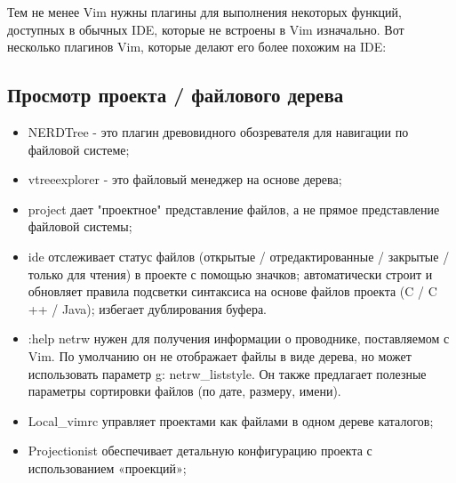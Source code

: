 Тем не менее Vim нужны плагины для выполнения некоторых функций, доступных в обычных IDE, которые 
не встроены в Vim изначально. Вот несколько плагинов Vim, которые делают его более похожим на IDE:\\

\subsection{Просмотр проекта / файлового дерева}
\begin{itemize}
    \item NERDTree - это плагин древовидного обозревателя для навигации по файловой системе;\\
    \item vtreeexplorer - это файловый менеджер на основе дерева;\\
    \item project дает "проектное" представление файлов, а не прямое представление файловой системы;\\
    \item ide отслеживает статус файлов (открытые / отредактированные / закрытые / только для чтения) 
        в проекте с помощью значков; автоматически строит и обновляет правила подсветки синтаксиса 
        на основе файлов проекта (C / C ++ / Java); избегает дублирования буфера.\\
    \item :help netrw нужен для получения информации о проводнике, поставляемом с Vim. По 
        умолчанию он не отображает файлы в виде дерева, но может использовать параметр 
        g: netrw\_liststyle. Он также предлагает полезные параметры сортировки файлов (по дате, 
        размеру, имени).\\
    \item Local\_vimrc управляет проектами как файлами в одном дереве каталогов;\\
    \item Projectionist обеспечивает детальную конфигурацию проекта с использованием «проекций»;\\
\end{itemize}


